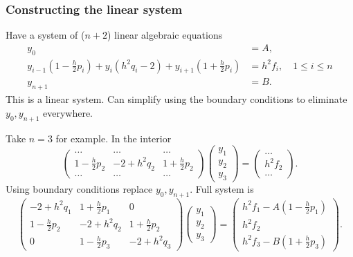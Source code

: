 \documentclass{beamer}
\begin{document}
\begin{frame}
  \frametitle{Constructing the linear system}

  Have a system of ($n+2$) linear algebraic equations
  \begin{align*}
    y_0 & = A, \\
    y_{i-1} \left( 1 - \tfrac{h}{2} p_i \right) +  y_{i} \left( h^2
      q_i - 2 \right) + y_{i+1} \left( 1 + \tfrac{h}{2} p_i \right) & =
    h^2 f_i, \quad 1 \le i \le n \\
    y_{n+1} & = B.
  \end{align*} \pause
  This is a linear system. Can simplify using the boundary conditions
  to eliminate $y_0, y_{n+1}$ everywhere.

  \vspace{1ex}

  \begin{overlayarea}{\textwidth}{0.4\textheight}
    {
      Take $n=3$ for example. In the interior
      {\small
        \begin{equation*}
          \begin{pmatrix}
            \dots & \dots & \dots \\
            1 - \tfrac{h}{2} p_2 & -2 + h^2 q_2 & 1 + \tfrac{h}{2} p_2 \\
            \dots & \dots & \dots
          \end{pmatrix}
          \begin{pmatrix}
            y_1 \\ y_2 \\ y_3
          \end{pmatrix} =
          \begin{pmatrix}
            \dots \\ h^2 f_2 \\ \dots
          \end{pmatrix}.
        \end{equation*}
      }
    }
    {
      Using boundary conditions replace $y_0, y_{n+1}$.  Full system
      is
      {\small
        \begin{equation*}
          \begin{pmatrix}
            -2 + h^2 q_1 & 1 + \tfrac{h}{2} p_1 & 0 \\
            1 - \tfrac{h}{2} p_2 & -2 + h^2 q_2 & 1 + \tfrac{h}{2} p_2 \\
            0 & 1 - \tfrac{h}{2} p_3 & -2 + h^2 q_3
          \end{pmatrix}
          \begin{pmatrix}
            y_1 \\ y_2 \\ y_3
          \end{pmatrix} =
          \begin{pmatrix}
            h^2 f_1 - A ( 1 - \tfrac{h}{2} p_1 ) \\ h^2 f_2
            \\ h^2 f_3 - B ( 1 + \tfrac{h}{2} p_3 )
          \end{pmatrix}.
        \end{equation*}
      }
    }
  \end{overlayarea}


\end{frame}
\end{document}
